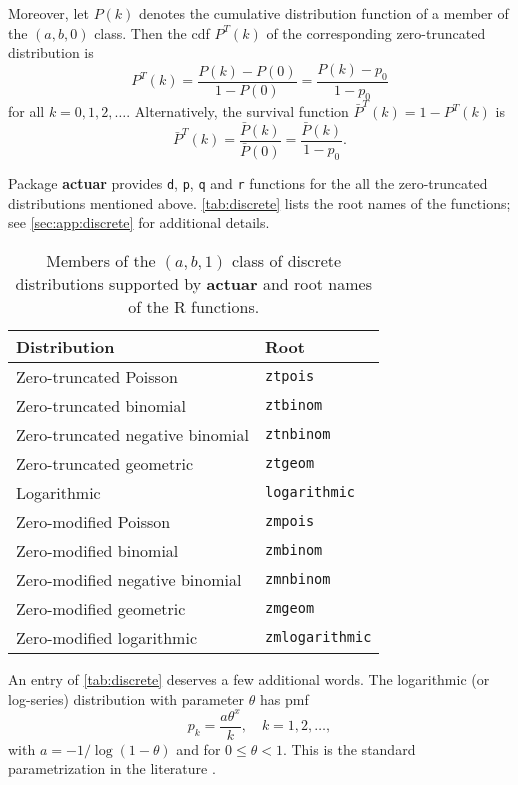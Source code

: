 \documentclass[x11names]{article}
\newcommand{\proglang}[1]{\textsf{#1}}
\newcommand{\pkg}[1]{\textbf{#1}}
\newcommand{\code}[1]{\texttt{#1}}
\begin{document}
Moreover, let $P(k)$ denotes the cumulative distribution function of a
member of the $(a, b, 0)$ class. Then the cdf $P^T(k)$ of the
corresponding zero-truncated distribution is
\begin{equation*}
  P^T(k)
  = \frac{P(k) - P(0)}{1 - P(0)}
  = \frac{P(k) - p_0}{1 - p_0}
\end{equation*}
for all $k = 0, 1, 2, \dots$. Alternatively, the survival function
$\bar{P}^T(k) = 1 - P^T(k)$ is
\begin{equation*}
  \bar{P}^T(k)
  = \frac{\bar{P}(k)}{\bar{P}(0)}
  = \frac{\bar{P}(k)}{1 - p_0}.
\end{equation*}

Package \pkg{actuar} provides \code{d}, \code{p}, \code{q} and
\code{r} functions for the all the zero-truncated distributions
mentioned above. \autoref{tab:discrete} lists the root names of the
functions; see \autoref{sec:app:discrete} for additional details.

\begin{table}
  \centering
  \begin{tabular}{ll}
    \toprule
    Distribution & Root \\
    \midrule
    Zero-truncated Poisson & \code{ztpois} \\
    Zero-truncated binomial & \code{ztbinom} \\
    Zero-truncated negative binomial & \code{ztnbinom} \\
    Zero-truncated geometric & \code{ztgeom} \\
    Logarithmic & \code{logarithmic} \\
    \addlinespace[6pt]
    Zero-modified Poisson & \code{zmpois} \\
    Zero-modified binomial & \code{zmbinom} \\
    Zero-modified negative binomial & \code{zmnbinom} \\
    Zero-modified geometric & \code{zmgeom} \\
    Zero-modified logarithmic & \code{zmlogarithmic} \\
    \bottomrule
  \end{tabular}
  \caption{Members of the $(a, b, 1)$ class of discrete distributions
    supported by \pkg{actuar} and root names of the \proglang{R}
    functions.}
  \label{tab:discrete}
\end{table}

An entry of \autoref*{tab:discrete} deserves a few additional words.
The logarithmic (or log-series) distribution with parameter $\theta$
has pmf
\begin{equation*}
  p_k = \frac{a \theta^x}{k}, \quad k = 1, 2, \dots,
\end{equation*}
with $a = -1/\log(1 - \theta)$ and for $0 \leq \theta < 1$. This is
the standard parametrization in the literature
\citep{Johnson:discrete:2005}.
\end{document}
